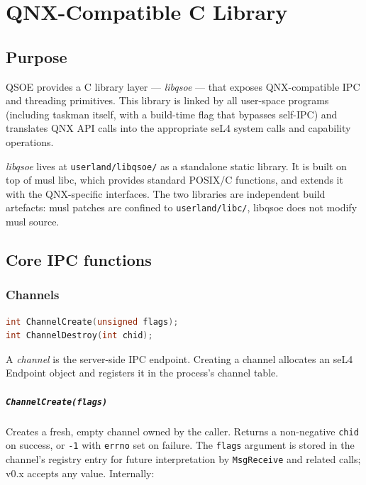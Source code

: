 \chapter{QNX-Compatible C Library}
\label{chap:libqsoe}

\section{Purpose}

QSOE provides a C library layer --- \emph{libqsoe} --- that exposes
QNX-compatible IPC and threading primitives.  This library is
linked by all user-space programs (including taskman itself, with a
build-time flag that bypasses self-IPC) and translates QNX API calls
into the appropriate seL4 system calls and capability operations.

\emph{libqsoe} lives at \texttt{userland/libqsoe/} as a standalone
static library.  It is built on top of musl libc, which provides
standard POSIX/C functions, and extends it with the QNX-specific
interfaces.  The two libraries are independent build artefacts: musl
patches are confined to \texttt{userland/libc/}, libqsoe does not
modify musl source.

\section{Core IPC functions}

\subsection{Channels}
\label{sec:channels}

\begin{lstlisting}[language=C]
int ChannelCreate(unsigned flags);
int ChannelDestroy(int chid);
\end{lstlisting}

A \emph{channel} is the server-side IPC endpoint.  Creating a channel
allocates an seL4 Endpoint object and registers it in the process's
channel table.

\paragraph{\texttt{ChannelCreate(flags)}}
Creates a fresh, empty channel owned by the caller.  Returns a
non-negative \texttt{chid} on success, or \texttt{-1} with \texttt{errno}
set on failure.  The \texttt{flags} argument is stored in the channel's
registry entry for future interpretation by \texttt{MsgReceive} and
related calls; v0.x accepts any value.  Internally:

